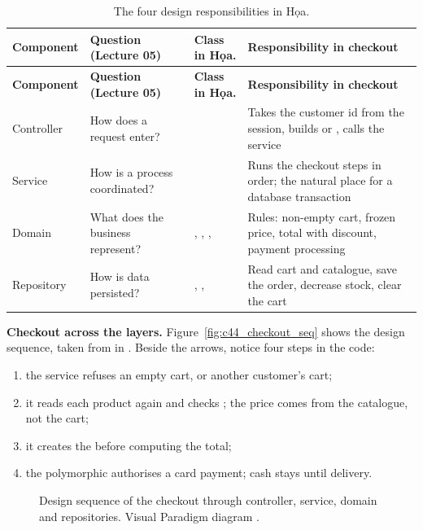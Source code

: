\begin{longtable}{@{}P{2.2cm}P{3.6cm}P{3.9cm}P{5.3cm}@{}}
\caption{The four design responsibilities in Họa.}\label{tab:resp44}\\
\toprule
\textbf{Component} & \textbf{Question (Lecture 05)} & \textbf{Class in Họa.} & \textbf{Responsibility in checkout}\\
\midrule
\endfirsthead
\toprule
\textbf{Component} & \textbf{Question (Lecture 05)} & \textbf{Class in Họa.} & \textbf{Responsibility in checkout}\\
\midrule
\endhead
\small Controller & \small How does a request enter? & \small {} & \small Takes the customer id from the session, builds  or , calls the service\\
\small Service & \small How is a process coordinated? & \small {} & \small Runs the checkout steps in order; the natural place for a database transaction\\
\small Domain & \small What does the business represent? & \small {}, , ,  & \small Rules: non-empty cart, frozen price, total with discount, payment processing\\
\small Repository & \small How is data persisted? & \small {}, ,  & \small Read cart and catalogue, save the order, decrease stock, clear the cart\\
\bottomrule
\end{longtable}

\textbf{Checkout across the layers.} Figure~\ref{fig:c44_checkout_seq} shows the design sequence, taken from
 in . Beside the arrows, notice four steps in the code:
\begin{enumerate}
\item the service refuses an empty cart, or another customer's cart;
\item it reads each product again and checks ; the price comes from the catalogue, not the cart;
\item it creates the  before computing the total;
\item the polymorphic  authorises a card payment; cash stays  until delivery.
\end{enumerate}

\begin{figure}[htbp]
\centering
{}
\caption[Design sequence of the checkout]{Design sequence of the checkout through controller, service, domain and
repositories. Visual Paradigm diagram .}
\label{fig:c44_checkout_seq}\label{fig:seq44}
\end{figure}

